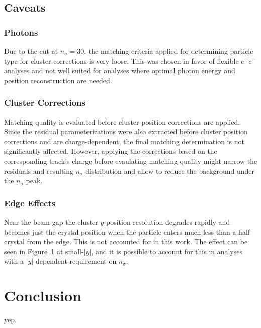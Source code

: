 \documentclass[amsmath,amssymb,notitlepage,12pt]{revtex4-1}
\begin{document}
\subsection{Caveats}
\subsubsection{Photons}
Due to the cut at $n_\sigma=30$, the matching criteria applied for determining particle type for cluster corrections is very loose.  This was chosen in favor of flexible $e^+e^-$ analyses and not well suited for analyses where optimal photon energy and position reconstruction are needed.
\subsubsection{Cluster Corrections}
Matching quality is evaluated before cluster position corrections are applied.  Since the residual parameterizations were also extracted before cluster position corrections and are charge-dependent, the final matching determination is not significantly affected.  However, applying the corrections based on the corresponding track's charge before evaulating matching quality might narrow the residuals and resulting $n_\sigma$ distribution and allow to reduce the background under the $n_\sigma$ peak.
\subsubsection{Edge Effects}
Near the beam gap the cluster $y$-position resolution degrades rapidly and becomes just the crystal position when the particle enters much less than a half crystal from the edge.  This is not accounted for in this work.  The effect can be seen in Figure~\ref{} at small-$|y|$, and it is possible to account for this in analyses with a $|y|$-dependent requirement on $n_\sigma$.


\section{Conclusion}
yep.


\end{document}
